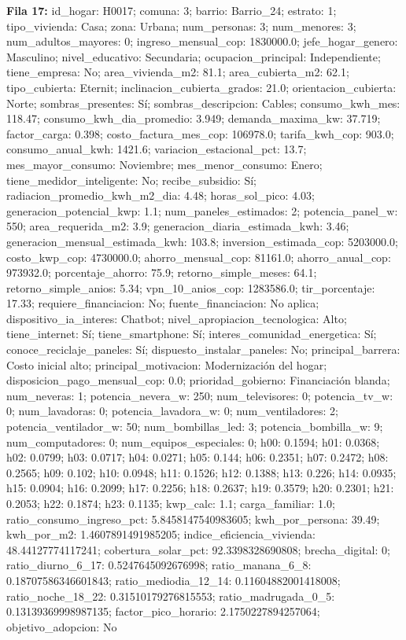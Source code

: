 {\footnotesize\textbf{Fila 17:} id\_hogar: H0017; comuna: 3; barrio: Barrio\_24; estrato: 1; tipo\_vivienda: Casa; zona: Urbana; num\_personas: 3; num\_menores: 3; num\_adultos\_mayores: 0; ingreso\_mensual\_cop: 1830000.0; jefe\_hogar\_genero: Masculino; nivel\_educativo: Secundaria; ocupacion\_principal: Independiente; tiene\_empresa: No; area\_vivienda\_m2: 81.1; area\_cubierta\_m2: 62.1; tipo\_cubierta: Eternit; inclinacion\_cubierta\_grados: 21.0; orientacion\_cubierta: Norte; sombras\_presentes: Sí; sombras\_descripcion: Cables; consumo\_kwh\_mes: 118.47; consumo\_kwh\_dia\_promedio: 3.949; demanda\_maxima\_kw: 37.719; factor\_carga: 0.398; costo\_factura\_mes\_cop: 106978.0; tarifa\_kwh\_cop: 903.0; consumo\_anual\_kwh: 1421.6; variacion\_estacional\_pct: 13.7; mes\_mayor\_consumo: Noviembre; mes\_menor\_consumo: Enero; tiene\_medidor\_inteligente: No; recibe\_subsidio: Sí; radiacion\_promedio\_kwh\_m2\_dia: 4.48; horas\_sol\_pico: 4.03; generacion\_potencial\_kwp: 1.1; num\_paneles\_estimados: 2; potencia\_panel\_w: 550; area\_requerida\_m2: 3.9; generacion\_diaria\_estimada\_kwh: 3.46; generacion\_mensual\_estimada\_kwh: 103.8; inversion\_estimada\_cop: 5203000.0; costo\_kwp\_cop: 4730000.0; ahorro\_mensual\_cop: 81161.0; ahorro\_anual\_cop: 973932.0; porcentaje\_ahorro: 75.9; retorno\_simple\_meses: 64.1; retorno\_simple\_anios: 5.34; vpn\_10\_anios\_cop: 1283586.0; tir\_porcentaje: 17.33; requiere\_financiacion: No; fuente\_financiacion: No aplica; dispositivo\_ia\_interes: Chatbot; nivel\_apropiacion\_tecnologica: Alto; tiene\_internet: Sí; tiene\_smartphone: Sí; interes\_comunidad\_energetica: Sí; conoce\_reciclaje\_paneles: Sí; dispuesto\_instalar\_paneles: No; principal\_barrera: Costo inicial alto; principal\_motivacion: Modernización del hogar; disposicion\_pago\_mensual\_cop: 0.0; prioridad\_gobierno: Financiación blanda; num\_neveras: 1; potencia\_nevera\_w: 250; num\_televisores: 0; potencia\_tv\_w: 0; num\_lavadoras: 0; potencia\_lavadora\_w: 0; num\_ventiladores: 2; potencia\_ventilador\_w: 50; num\_bombillas\_led: 3; potencia\_bombilla\_w: 9; num\_computadores: 0; num\_equipos\_especiales: 0; h00: 0.1594; h01: 0.0368; h02: 0.0799; h03: 0.0717; h04: 0.0271; h05: 0.144; h06: 0.2351; h07: 0.2472; h08: 0.2565; h09: 0.102; h10: 0.0948; h11: 0.1526; h12: 0.1388; h13: 0.226; h14: 0.0935; h15: 0.0904; h16: 0.2099; h17: 0.2256; h18: 0.2637; h19: 0.3579; h20: 0.2301; h21: 0.2053; h22: 0.1874; h23: 0.1135; kwp\_calc: 1.1; carga\_familiar: 1.0; ratio\_consumo\_ingreso\_pct: 5.8458147540983605; kwh\_por\_persona: 39.49; kwh\_por\_m2: 1.4607891491985205; indice\_eficiencia\_vivienda: 48.44127774117241; cobertura\_solar\_pct: 92.3398328690808; brecha\_digital: 0; ratio\_diurno\_6\_17: 0.5247645092676998; ratio\_manana\_6\_8: 0.18707586346601843; ratio\_mediodia\_12\_14: 0.11604882001418008; ratio\_noche\_18\_22: 0.31510179276815553; ratio\_madrugada\_0\_5: 0.13139369998987135; factor\_pico\_horario: 2.1750227894257064; objetivo\_adopcion: No\par}
